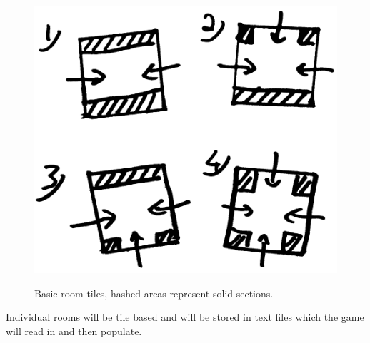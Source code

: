 \begin{figure}[ht]
\centering
\includegraphics[scale=0.2, trim = 0cm 0cm 0cm -1cm]{images/16x16}
\label{fig:room}
\caption{Basic room tiles, hashed areas represent solid sections.}
\end{figure}

Individual rooms will be tile based and will be stored in text files which the game will read in and then populate.
